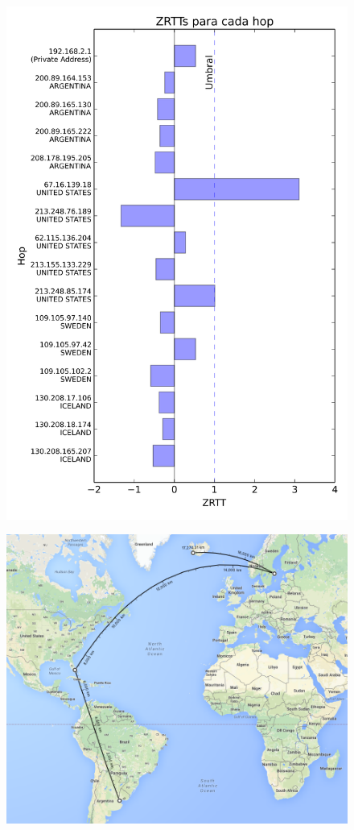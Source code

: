 \begin{figure}[htp]
 \centering
 \includegraphics[scale=0.5]{imgs/iceland.png}
\end{figure}

\begin{figure}[htp]
 \centering
  \includegraphics[width=5in]{imgs/maps/iceland.png}
\end{figure}

